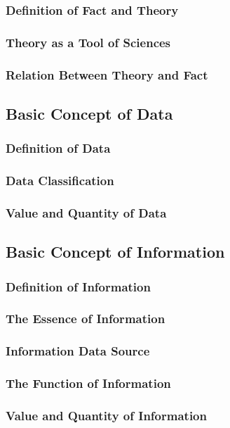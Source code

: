 \documentclass[12pt,titlepage]{article}
\begin{document}
\subsubsection{Definition of Fact and Theory}
\subsubsection{Theory as a Tool of Sciences}
\subsubsection{Relation Between Theory and Fact}

\subsection{Basic Concept of Data}
\subsubsection{Definition of Data}
\subsubsection{Data Classification}
\subsubsection{Value and Quantity of Data}

\subsection{Basic Concept of Information}
\subsubsection{Definition of Information}
\subsubsection{The Essence of Information}
\subsubsection{Information Data Source}
\subsubsection{The Function of Information}
\subsubsection{Value and Quantity of Information}
\end{document}
